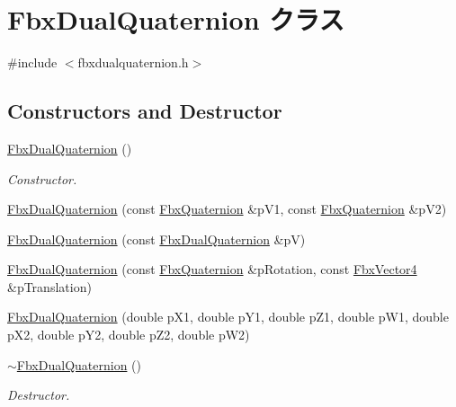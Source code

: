 \hypertarget{class_fbx_dual_quaternion}{}\section{Fbx\+Dual\+Quaternion クラス}
\label{class_fbx_dual_quaternion}


{\ttfamily \#include $<$fbxdualquaternion.\+h$>$}

\subsection*{Constructors and Destructor}
\begin{DoxyCompactItemize}
\item 
\hyperlink{class_fbx_dual_quaternion_a254ddc7798c408f023ee7ab3f10c4980}{Fbx\+Dual\+Quaternion} ()
\begin{DoxyCompactList}\small\item\em Constructor. \end{DoxyCompactList}\item 
\hyperlink{class_fbx_dual_quaternion_aa8cb9c92f1ad60ff2146473f24922224}{Fbx\+Dual\+Quaternion} (const \hyperlink{class_fbx_quaternion}{Fbx\+Quaternion} \&p\+V1, const \hyperlink{class_fbx_quaternion}{Fbx\+Quaternion} \&p\+V2)
\item 
\hyperlink{class_fbx_dual_quaternion_a63f775c43b393723c50456d6eff24aff}{Fbx\+Dual\+Quaternion} (const \hyperlink{class_fbx_dual_quaternion}{Fbx\+Dual\+Quaternion} \&pV)
\item 
\hyperlink{class_fbx_dual_quaternion_a77d73924d4fd8f1cc5eb9bf4a3e4946d}{Fbx\+Dual\+Quaternion} (const \hyperlink{class_fbx_quaternion}{Fbx\+Quaternion} \&p\+Rotation, const \hyperlink{class_fbx_vector4}{Fbx\+Vector4} \&p\+Translation)
\item 
\hyperlink{class_fbx_dual_quaternion_addf50704bb3839f7c7ccafc5a0fac128}{Fbx\+Dual\+Quaternion} (double p\+X1, double p\+Y1, double p\+Z1, double p\+W1, double p\+X2, double p\+Y2, double p\+Z2, double p\+W2)
\item 
\hyperlink{class_fbx_dual_quaternion_a1b1a778a68116c8934ac76eb98958f48}{$\sim$\+Fbx\+Dual\+Quaternion} ()
\begin{DoxyCompactList}\small\item\em Destructor. \end{DoxyCompactList}\end{DoxyCompactItemize}
